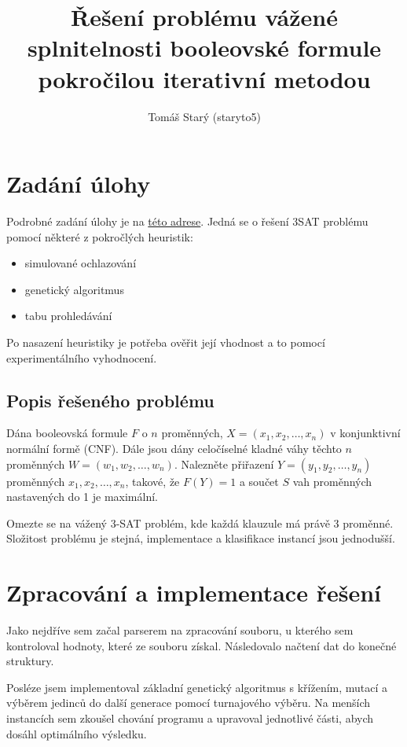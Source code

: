 \documentclass{article}
\title{Řešení problému vážené splnitelnosti booleovské formule pokročilou iterativní metodou}
\author{Tomáš Starý (staryto5)}
\begin{document}
    \maketitle
    \tableofcontents
    \pagebreak

    \section{Zadání úlohy}

    Podrobné zadání úlohy je na \href{https://moodle-vyuka.cvut.cz/mod/assign/view.php?id=48355}{této adrese}. Jedná se o řešení 3SAT problému pomocí některé z pokročlých heuristik:

    \begin{itemize}
        \item {simulované ochlazování}
        \item {genetický algoritmus}
        \item {tabu prohledávání}
    \end{itemize}

    Po nasazení heuristiky je potřeba ověřit její vhodnost a to pomocí experimentálního vyhodnocení.

    \subsection{Popis řešeného problému}

    Dána booleovská formule $F$ o $n$ proměnných, $X = (x_1, x_2,\dots,x_n)$ v konjunktivní normální formě (CNF).
    Dále jsou dány celočíselné kladné váhy těchto $n$ proměnných $W = (w_1, w_2,\dots, w_n)$. Nalezněte přiřazení $Y=(y_1, y_2,\dots, y_n)$
    proměnných $x_1, x_2,\dots, x_n$, takové, že $F(Y) = 1$ a součet $S$ vah proměnných nastavených do 1 je maximální.

    Omezte se na vážený 3-SAT problém, kde každá klauzule má právě 3 proměnné. Složitost problému je stejná, implementace a klasifikace instancí jsou jednodušší.

    \section{Zpracování a implementace řešení}

    Jako nejdříve sem začal parserem na zpracování souboru, u kterého sem kontroloval hodnoty, které ze souboru získal. Následovalo načtení dat do konečné struktury.

    Posléze jsem implementoval základní genetický algoritmus s křížením, mutací a výběrem jedinců do další generace pomocí turnajového výběru. Na menších instancích sem
    zkoušel chování programu a upravoval jednotlivé části, abych dosáhl optimálního výsledku.
\end{document}
